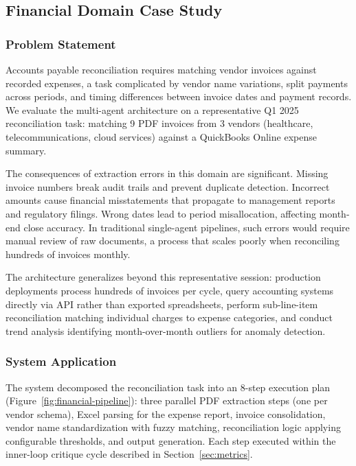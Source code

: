 \documentclass[sigconf]{acmart}
\begin{document}
\subsection{Financial Domain Case Study}
\label{sec:finance}

\subsubsection{Problem Statement}

Accounts payable reconciliation requires matching vendor invoices against recorded expenses, a task complicated by vendor name variations, split payments across periods, and timing differences between invoice dates and payment records. We evaluate the multi-agent architecture on a representative Q1 2025 reconciliation task: matching 9 PDF invoices from 3 vendors (healthcare, telecommunications, cloud services) against a QuickBooks Online expense summary.

The consequences of extraction errors in this domain are significant. Missing invoice numbers break audit trails and prevent duplicate detection. Incorrect amounts cause financial misstatements that propagate to management reports and regulatory filings. Wrong dates lead to period misallocation, affecting month-end close accuracy. In traditional single-agent pipelines, such errors would require manual review of raw documents, a process that scales poorly when reconciling hundreds of invoices monthly.

The architecture generalizes beyond this representative session: production deployments process hundreds of invoices per cycle, query accounting systems directly via API rather than exported spreadsheets, perform sub-line-item reconciliation matching individual charges to expense categories, and conduct trend analysis identifying month-over-month outliers for anomaly detection.

\subsubsection{System Application}

The system decomposed the reconciliation task into an 8-step execution plan (Figure~\ref{fig:financial-pipeline}): three parallel PDF extraction steps (one per vendor schema), Excel parsing for the expense report, invoice consolidation, vendor name standardization with fuzzy matching, reconciliation logic applying configurable thresholds, and output generation. Each step executed within the inner-loop critique cycle described in Section~\ref{sec:metrics}.
\end{document}
